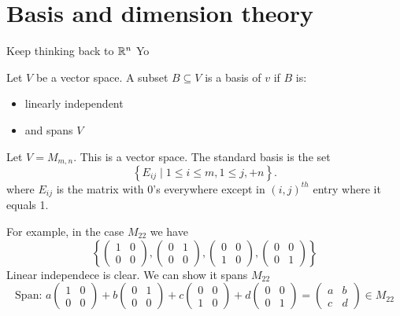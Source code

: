 
\section{Basis and dimension theory}
Keep thinking back to $\mathbb{R}^{n}$
Yo

\begin{definition}[Basis of V]
	Let $V$ be a vector space. A subset $B \subseteq V$ is a basis of $v$ if $B$ is:
	\begin{itemize}
		\item linearly independent 
		\item and spans $V$
	\end{itemize}
	\end{definition}

\begin{eg}
	Let $V= M_{m,n}$. This is a vector space. The standard basis is the set
	 \[
		 \left\{ E_{ij} \mid 1 \le i\le m, 1\le j,+n \right\} 
	.\] where $E_{ij}$ is the matrix with $0$'s everywhere except in $(i,j)^{th}$ entry where it equals 1.
	
	For example, in the case $M_{22}$ we have
	\[
		\left\{ \begin{pmatrix} 1 & 0 \\ 0 & 0 \end{pmatrix}, \begin{pmatrix} 0 & 1\\ 0 & 0 \end{pmatrix}, \begin{pmatrix} 0 &0 \\ 1 &0 \end{pmatrix}, \begin{pmatrix} 0 &0 \\ 0&1 \end{pmatrix}    \right\} 
	\] 
	Linear independece is clear. We can show it spans $M_{22}$ 
	\[
		\text{Span: } a\begin{pmatrix} 1 & 0\\ 0 & 0 \end{pmatrix} + b\begin{pmatrix} 0 & 1\\ 0 & 0 \end{pmatrix} + c\begin{pmatrix} 0 & 0\\ 1 & 0 \end{pmatrix} + d\begin{pmatrix} 0 & 0\\ 0 & 1 \end{pmatrix} = \begin{pmatrix} a &b \\ c&d \end{pmatrix} \in M_{22} 
	\] 
\end{eg}

